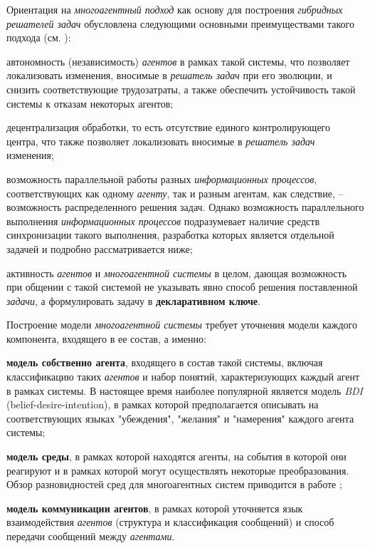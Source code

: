 Ориентация на \textit{многоагентный подход} как основу для построения \textit{гибридных решателей задач} обусловлена следующими основными преимуществами такого подхода (см. ):
\begin{textitemize}
\item автономность (независимость) \textit{агентов} в рамках такой системы, что позволяет локализовать изменения, вносимые в \textit{решатель задач} при его эволюции, и снизить соответствующие трудозатраты, а также обеспечить устойчивость такой системы к отказам некоторых агентов;
\item децентрализация обработки, то есть отсутствие единого контролирующего центра, что также позволяет локализовать вносимые в \textit{решатель задач} изменения;
\item возможность параллельной работы разных \textit{информационных процессов}, соответствующих как одному \textit{агенту}, так и разным агентам, как следствие, -- возможность распределенного решения задач. Однако возможность параллельного выполнения \textit{информационных процессов} подразумевает наличие средств синхронизации такого выполнения, разработка которых является отдельной задачей и подробно рассматривается ниже;
\item активность \textit{агентов} и \textit{многоагентной системы} в целом, дающая возможность при общении с такой системой не указывать явно способ решения поставленной \textit{задачи}, а формулировать задачу в \textbf{декларативном ключе}.
\end{textitemize}

Построение модели \textit{многоагентной системы} требует уточнения модели каждого компонента, входящего в ее состав, а именно:
\begin{textitemize}
\item \textbf{модель собственно агента}, входящего в состав такой системы, включая классификацию таких \textit{агентов} и набор понятий, характеризующих каждый агент в рамках системы. В настоящее время наиболее популярной является модель \textit{BDI} (belief-desire-intention), в рамках которой предполагается описывать на соответствующих языках "убеждения"{}, "желания"{} и "намерения"{} каждого агента системы;
\item \textbf{модель среды}, в рамках которой находятся агенты, на события в которой они реагируют и в рамках которой могут осуществлять некоторые преобразования. Обзор разновидностей сред для многоагентных систем приводится в работе ;
\item \textbf{модель коммуникации агентов}, в рамках которой уточняется язык взаимодействия \textit{агентов} (структура и классификация сообщений) и способ передачи сообщений между \textit{агентами}.
\end{textitemize}

